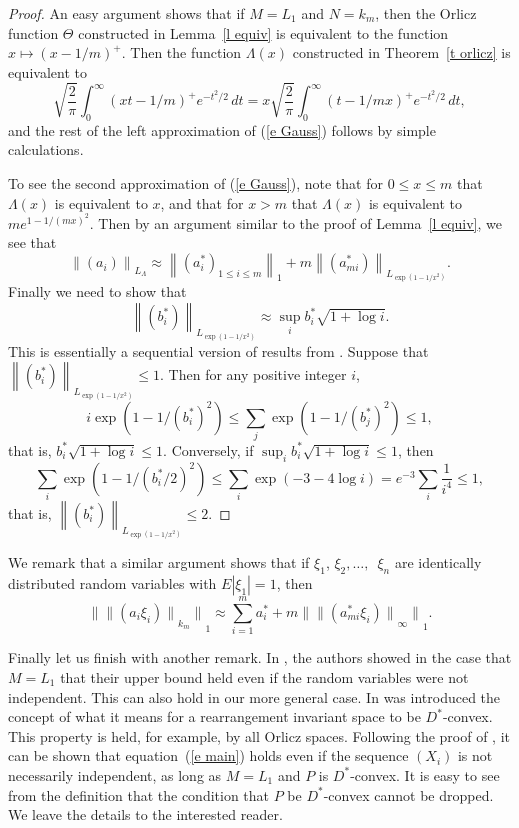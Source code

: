 \documentclass[12pt]{amsart}
\newcommand{\normo}[1]{{\left\|#1\right\|}}
\newcommand{\snormo}[1]{{\mathopen\|#1\mathclose\|}}
\begin{document}
\begin{proof}
An easy argument shows that if $M=L_1$ and $N=k_m$, then
the Orlicz function $\Theta$ constructed
in Lemma~\ref{l equiv} is equivalent to the 
function $x \mapsto (x-1/m)^+$.  
Then the function
$\Lambda(x)$ constructed in Theorem~\ref{t orlicz} is equivalent to
\[
\sqrt{\frac2\pi} \int_0^\infty (x t-1/m)^+ e^{-t^2/2} \, dt
=
x \sqrt{\frac2\pi} \int_0^\infty (t-1/mx)^+ e^{-t^2/2} \, dt ,
\]
and the rest of the left approximation of (\ref{e Gauss}) 
follows by simple calculations.

To see the second approximation of (\ref{e Gauss}), note that for 
$0 \le x \le m$ that
$\Lambda(x)$ is equivalent to $x$, and that for $x>m$ that $\Lambda(x)$
is equivalent to $m e^{1-1/(mx)^2}$.  
Then 
by an argument similar to the
proof of Lemma~\ref{l equiv}, we see that 
\[ 
   \normo{(a_i)}_{L_\Lambda} \approx
   \normo{(a^*_i)_{1 \le i \le m}}_1
   +
   m \normo{(a^*_{m i})}_{L_{\exp(1-1/x^2)}} .
\]
Finally we need to show that
\[
   \normo{(b^*_{i})}_{L_{\exp(1-1/x^2)}} 
   \approx
   \sup_{i} b^*_{i} \sqrt{1+\log i} .
\]
This is essentially a sequential version of results from
\cite{bennett-rudnick}.  
Suppose that 
$\normo{(b^*_{i})}_{L_{\exp(1-1/x^2)}} \le 1$.  
Then for any positive integer 
$i$,
\[
   i \exp(1-1/(b^*_i)^2) \le \sum_j \exp(1-1/(b^*_j)^2) \le 1,
\]
that is, $b^*_{i} \sqrt{1+\log i} \le 1$.  
Conversely, 
if $\sup_i b^*_i \sqrt{1+\log i} \le 1$,
then
\[
   \sum_i \exp(1-1/(b^*_i/2)^2)
   \le
   \sum_i \exp(-3-4\log i)
   = 
   e^{-3} \sum_i \frac1{i^4} \le 1,
\]
that is, $\normo{(b^*_{i})}_{L_{\exp(1-1/x^2)}} \le 2$.
\end{proof}

We remark that a similar argument shows that
if $\xi_1$, $\xi_2,\dots,$\ $\xi_n$ are identically distributed
random variables with $E|\xi_1| = 1$, then
\[
   \snormo{\snormo{(a_i \xi_i)}_{k_m}}_1 
   \approx \sum_{i=1}^m a^*_i  + 
    m \snormo{\snormo{(a^*_{m i} \xi_i)}_\infty}_1 .
\]
\bigskip

Finally let us finish with another remark.  
In \cite{gordon et al}, the authors
showed in the case that $M = L_1$
that their upper bound held even if the random variables were
not independent.  
This can also hold in our more general case.
In \cite{montgomery-smith-semenov} was introduced the concept of what
it means for a rearrangement invariant space to be $D^*$-convex.
This property is held, for example, by all Orlicz spaces.
Following the proof of \cite[Theorem 27]{montgomery-smith-semenov},
it can be shown that equation~(\ref{e main}) holds even if the
sequence $(X_i)$ is not necessarily independent, as long as 
$M = L_1$ and $P$ is $D^*$-convex.  
It is easy to see from the definition that the condition that
$P$ be $D^*$-convex cannot be dropped.
We leave the details to the
interested reader.
\end{document}
